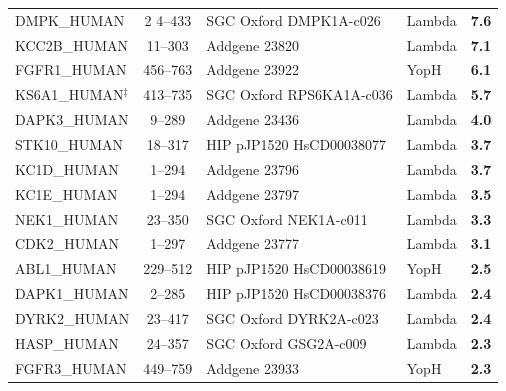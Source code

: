 \documentclass[9pt,lineno]{elife}
\begin{document}
\begin{table}[h!]
\begin{tabular}{p{3cm}cp{3.5cm}p{3cm}c}
DMPK\_HUMAN  &2 4--433 & SGC Oxford DMPK1A-c026 & Lambda                    & \cellcolor{yellow!55}\bf{7.6}                             \\
KCC2B\_HUMAN & 11--303 & Addgene 23820 & Lambda                    & \cellcolor{yellow!55}\bf{7.1}                             \\
FGFR1\_HUMAN & 456--763 & Addgene 23922 & YopH         & \cellcolor{orange!55}\bf{6.1}                             \\
KS6A1\_HUMAN$^\ddag$ &413--735 & SGC Oxford RPS6KA1A-c036 &   Lambda                    & \cellcolor{orange!55}\bf{5.7}                             \\
DAPK3\_HUMAN & 9--289 & Addgene 23436 &  Lambda                    & \cellcolor{orange!55}\bf{4.0}                             \\
STK10\_HUMAN & 18--317 & HIP pJP1520 HsCD00038077 &  Lambda                    & \cellcolor{orange!55}\bf{3.7}                             \\
KC1D\_HUMAN  & 1--294 & Addgene 23796 & Lambda                    & \cellcolor{orange!55}\bf{3.7}                             \\
KC1E\_HUMAN  & 1--294 & Addgene 23797 & Lambda                    & \cellcolor{orange!55}\bf{3.5}                             \\
NEK1\_HUMAN  & 23--350 & SGC Oxford NEK1A-c011 & Lambda                    & \cellcolor{orange!55}\bf{3.3}                             \\
CDK2\_HUMAN  & 1--297 & Addgene 23777 & Lambda                    & \cellcolor{orange!55}\bf{3.1}                             \\
ABL1\_HUMAN  & 229--512 & HIP pJP1520 HsCD00038619 & YopH         & \cellcolor{orange!55}\bf{2.5}                             \\
DAPK1\_HUMAN & 2--285 & HIP pJP1520 HsCD00038376 & Lambda                    & \cellcolor{orange!55}\bf{2.4}                             \\
DYRK2\_HUMAN & 23--417 & SGC Oxford DYRK2A-c023 & Lambda                    & \cellcolor{orange!55}\bf{2.4}                             \\
HASP\_HUMAN  & 24--357 & SGC Oxford GSG2A-c009 &  Lambda                    & \cellcolor{orange!55}\bf{2.3}                             \\
FGFR3\_HUMAN & 449--759	& Addgene 23933 & YopH         & \cellcolor{orange!55}\bf{2.3}                             \\
\bottomrule
\end{tabular}
\end{table}
\end{document}

